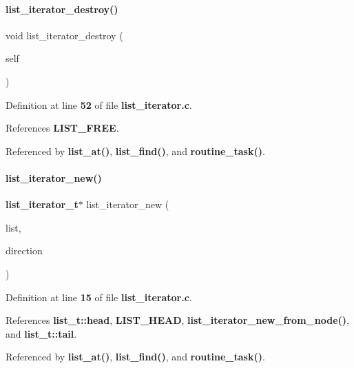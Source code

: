 \mbox{\label{list_8h_ad16fa29ddbb444070ea65f871e1c0ba2}} 
\paragraph{list\+\_\+iterator\+\_\+destroy()}
{\footnotesize\ttfamily void list\+\_\+iterator\+\_\+destroy (\begin{DoxyParamCaption}\item[{\textbf{ list\+\_\+iterator\+\_\+t} $\ast$}]{self }\end{DoxyParamCaption})}



Definition at line \textbf{ 52} of file \textbf{ list\+\_\+iterator.\+c}.



References \textbf{ L\+I\+S\+T\+\_\+\+F\+R\+EE}.



Referenced by \textbf{ list\+\_\+at()}, \textbf{ list\+\_\+find()}, and \textbf{ routine\+\_\+task()}.

\mbox{\label{list_8h_a3c956afda343b4a6aaf68fbd4b446733}} 
\paragraph{list\+\_\+iterator\+\_\+new()}
{\footnotesize\ttfamily \textbf{ list\+\_\+iterator\+\_\+t}$\ast$ list\+\_\+iterator\+\_\+new (\begin{DoxyParamCaption}\item[{\textbf{ list\+\_\+t} $\ast$}]{list,  }\item[{\textbf{ list\+\_\+direction\+\_\+t}}]{direction }\end{DoxyParamCaption})}



Definition at line \textbf{ 15} of file \textbf{ list\+\_\+iterator.\+c}.



References \textbf{ list\+\_\+t\+::head}, \textbf{ L\+I\+S\+T\+\_\+\+H\+E\+AD}, \textbf{ list\+\_\+iterator\+\_\+new\+\_\+from\+\_\+node()}, and \textbf{ list\+\_\+t\+::tail}.



Referenced by \textbf{ list\+\_\+at()}, \textbf{ list\+\_\+find()}, and \textbf{ routine\+\_\+task()}.

